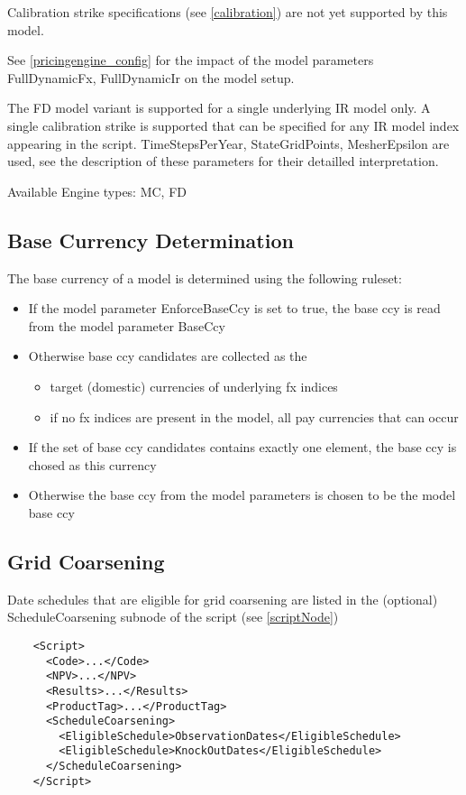 Calibration strike specifications (see \ref{calibration}) are not yet supported by this model.

See \ref{pricingengine_config} for the impact of the model parameters FullDynamicFx, FullDynamicIr on the model setup.

The FD model variant is supported for a single underlying IR model only. A single calibration strike is supported that
can be specified for any IR model index appearing in the script. TimeStepsPerYear, StateGridPoints, MesherEpsilon are
used, see the description of these parameters for their detailled interpretation.

\smallskip
Available Engine types: MC, FD

\subsection{Base Currency Determination}\label{baseccy_determination}

The base currency of a model is determined using the following ruleset:

\begin{itemize}
\item If the model parameter EnforceBaseCcy is set to true, the base ccy is read from the model parameter BaseCcy
\item Otherwise base ccy candidates are collected as the
  \begin{itemize}
    \item target (domestic) currencies of underlying fx indices
    \item if no fx indices are present in the model, all pay currencies that can occur
  \end{itemize}
\item If the set of base ccy candidates contains exactly one element, the base ccy is chosed as this currency
\item Otherwise the base ccy from the model parameters is chosen to be the model base ccy
\end{itemize}

\subsection{Grid Coarsening}\label{grid_coarsening}

Date schedules that are eligible for grid coarsening are listed in the (optional) ScheduleCoarsening subnode of the
script (see \ref{scriptNode})

\begin{verbatim}
    <Script>
      <Code>...</Code>
      <NPV>...</NPV>
      <Results>...</Results>
      <ProductTag>...</ProductTag>
      <ScheduleCoarsening>
        <EligibleSchedule>ObservationDates</EligibleSchedule>
        <EligibleSchedule>KnockOutDates</EligibleSchedule>
      </ScheduleCoarsening>
    </Script>
\end{verbatim}

